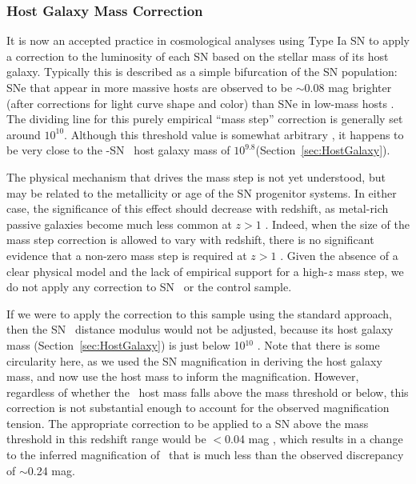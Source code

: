 \subsubsection{Host Galaxy Mass Correction}
\label{sec:HostGalaxyMassCorrection}

It is now an accepted practice in cosmological analyses using Type Ia
SN to apply a correction to the luminosity of each SN based on the
stellar mass of its host galaxy. Typically this is described as a
simple bifurcation of the SN population: SNe that appear in more
massive hosts are observed to be $\sim$0.08 mag brighter (after
corrections for light curve shape and color) than SNe in low-mass
hosts \citep{Kelly:2010,Sullivan:2010}.  The dividing line for this
purely empirical ``mass step'' correction is generally set around
$10^{10}$\Msun.  Although this threshold value is somewhat arbitrary \citep[see
e.g.][]{Betoule:2014}, it happens to be very close to the
-SN \tomas\ host galaxy mass of $10^{9.8}$\Msun (Section~\ref{sec:HostGalaxy}).

The physical mechanism that drives the mass step is not yet
understood, but may be related to the metallicity or age of the SN
progenitor systems.  In either case, the significance of this effect
should decrease with redshift, as metal-rich passive galaxies become
much less common at $z>1$ \citep[see
e.g.][]{Rigault:2013,Childress:2014b}.  Indeed, when the size of the
mass step correction is allowed to vary with redshift, there is no
significant evidence that a non-zero mass step is required at
$z>1$ \citep{Suzuki:2012,Shafer:2014,Betoule:2014}.  Given the
absence of a clear physical model and the lack of empirical support
for a high-$z$ mass step, we do not apply any correction to SN \tomas\
or the control sample. 

If we were to apply the correction to this sample using the standard
approach, then the SN \tomas\ distance modulus would not be adjusted,
because its host galaxy mass (Section~\ref{sec:HostGalaxy}) is just
below 10$^{10}$ \Msun. Note that there is some circularity here, as we
used the SN magnification in deriving the host galaxy mass, and now
use the host mass to inform the magnification.  However, regardless of
whether the \tomas\ host mass falls above the mass threshold or below,
this correction is not substantial enough to account for the observed
magnification tension.  The appropriate correction to be applied to
a SN above the mass threshold in this redshift range would be $<$0.04
mag \citep{Rigault:2013,Childress:2014b}, which results in a change to
the inferred magnification of \tomas\ that is much less than the
observed discrepancy of $\sim$0.24 mag.

